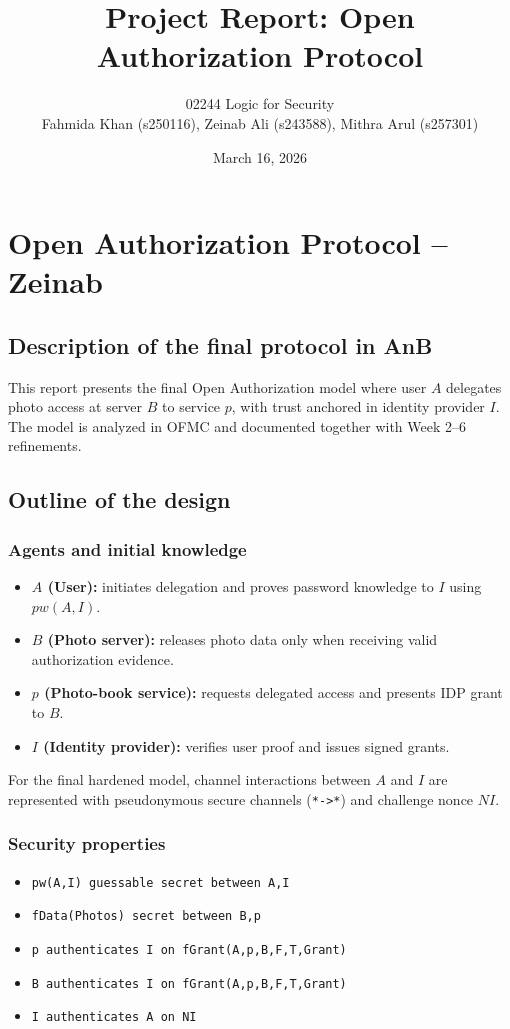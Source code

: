 \documentclass[11pt,a4paper]{article}
\title{Project Report: Open Authorization Protocol}
\author{02244 Logic for Security\\
Fahmida Khan (s250116), Zeinab Ali (s243588), Mithra Arul (s257301)}
\date{March 16, 2026}
\begin{document}
\maketitle
\tableofcontents
\newpage

\section{Open Authorization Protocol -- Zeinab}
\subsection{Description of the final protocol in AnB}
This report presents the final Open Authorization model where user $A$ delegates photo access at server $B$ to service $p$, with trust anchored in identity provider $I$.
The model is analyzed in OFMC and documented together with Week 2--6 refinements.

\subsection{Outline of the design}
\subsubsection{Agents and initial knowledge}
\begin{itemize}[leftmargin=1.2em]
  \item \textbf{$A$ (User):} initiates delegation and proves password knowledge to $I$ using $pw(A,I)$.
  \item \textbf{$B$ (Photo server):} releases photo data only when receiving valid authorization evidence.
  \item \textbf{$p$ (Photo-book service):} requests delegated access and presents IDP grant to $B$.
  \item \textbf{$I$ (Identity provider):} verifies user proof and issues signed grants.
\end{itemize}

For the final hardened model, channel interactions between $A$ and $I$ are represented with pseudonymous secure channels (\texttt{*->*}) and challenge nonce $NI$.

\subsubsection{Security properties}
\begin{itemize}[leftmargin=1.2em]
  \item \texttt{pw(A,I) guessable secret between A,I}
  \item \texttt{fData(Photos) secret between B,p}
  \item \texttt{p authenticates I on fGrant(A,p,B,F,T,Grant)}
  \item \texttt{B authenticates I on fGrant(A,p,B,F,T,Grant)}
  \item \texttt{I authenticates A on NI}
\end{itemize}
\end{document}
